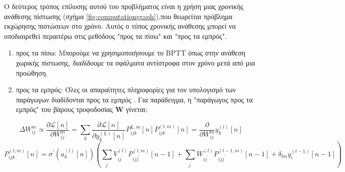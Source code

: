 \documentclass[12pt]{report}
\begin{document}
Ο δεύτερος τρόπος επίλυσης αυτού του προβλήματος είναι η χρήση μιας χρονικής ανάθεσης πίστωσης (σχήμα \ref{fig:computationgraph}),που θεωρείται πρόβλημα εκχώρησης πιστώσεων στο χρόνο. Αυτός ο τύπος χρονικής ανάθεσης μπορεί να υποδιαιρεθεί περαιτέρω στις μεθόδους "προς τα πίσω" και "προς τα εμπρός".
\begin{enumerate}
  
    \item προς τα πίσω: Μπορούμε να χρησιμοποιήσουμε το \textlatin{BPTT} όπως στην ανάθεση χωρικής πίστωσης, διαδίδουμε τα σφάλματα αντίστροφα στον χρόνο μετά από μια προώθηση.
    \item προς τα εμπρός: Όλες οι απαραίτητες πληροφορίες για τον υπολογισμό των παράγωγων διαδίδονται προς τα εμπρός \cite{williams1989}. Για παράδειγμα, η "παράγωγος προς τα εμπρός" του βάρους τροφοδοσίας $\mathbf{W}$ γίνεται:
\end{enumerate}
\begin{equation*}
\Delta W_{i j}^{m} \propto \frac{\partial \mathcal{L}[n]}{\partial W_{i j}^{m}}=\sum_{k} \frac{\partial \mathcal{L}[n]}{\partial y_{k}^{(L)}[n]} P_{i j k}^{L, m}[n]
P_{i j k}^{(l, m)}[n]=\frac{\partial}{\partial W_{i j}^{m}} y_{k}^{(l)}[n]
\end{equation*}
\begin{equation*}
P_{i j k}^{(l, m)}[n]=\sigma^{\prime}\left(a_{k}^{(l)}[n]\right)\left(\sum_{j^{\prime}} V_{i j^{\prime}}^{(l)} P_{i j j^{\prime}}^{(l, m)}[n-1]+\sum_{j^{\prime}} W_{i j^{\prime}}^{(l)} P_{i j j^{\prime}}^{(l-1, m)}[n-1]+\delta_{l m} y_{i}^{(l-1)}[n-1]\right)
\end{equation*}
\end{document}
